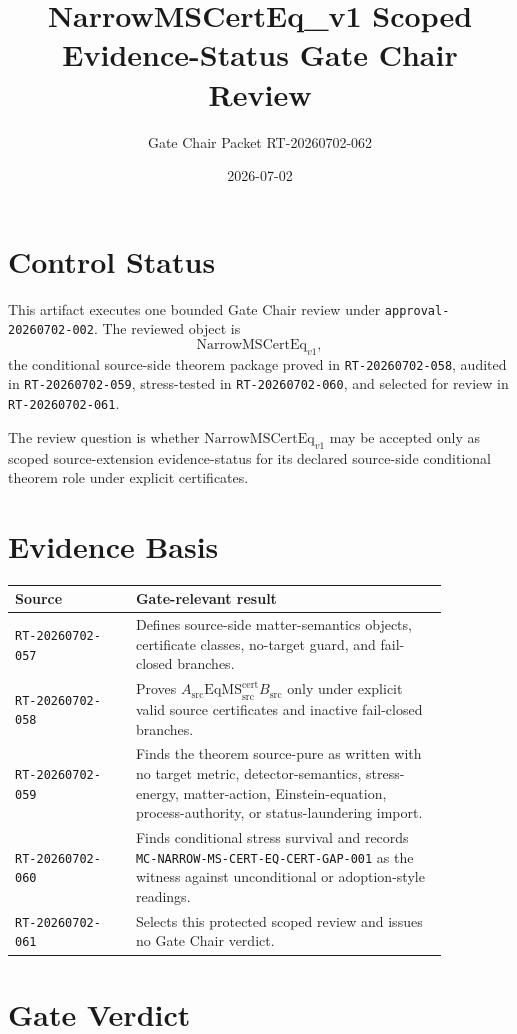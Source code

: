 \documentclass[11pt]{article}
\title{NarrowMSCertEq\_v1 Scoped Evidence-Status Gate Chair Review}
\author{Gate Chair Packet RT-20260702-062}
\date{2026-07-02}
\newcommand{\EqMScert}{\mathrm{EqMS}^{\mathrm{cert}}_{\mathrm{src}}}
\newcommand{\Asrc}{A_{\mathrm{src}}}
\newcommand{\Bsrc}{B_{\mathrm{src}}}
\newcommand{\NarrowMSCertEq}{\mathrm{NarrowMSCertEq}_{v1}}
\begin{document}
\maketitle

\section{Control Status}

This artifact executes one bounded Gate Chair review under
\texttt{approval-20260702-002}. The reviewed object is
\[
  \NarrowMSCertEq,
\]
the conditional source-side theorem package proved in \texttt{RT-20260702-058},
audited in \texttt{RT-20260702-059}, stress-tested in
\texttt{RT-20260702-060}, and selected for review in
\texttt{RT-20260702-061}.

The review question is whether \(\NarrowMSCertEq\) may be accepted only as
scoped source-extension evidence-status for its declared source-side
conditional theorem role under explicit certificates.

\section{Evidence Basis}

\begin{longtable}{p{0.24\linewidth}p{0.62\linewidth}}
\toprule
Source & Gate-relevant result \\
\midrule
\texttt{RT-20260702-057} & Defines source-side matter-semantics objects,
certificate classes, no-target guard, and fail-closed branches. \\
\texttt{RT-20260702-058} & Proves \(\Asrc \EqMScert \Bsrc\) only under
explicit valid source certificates and inactive fail-closed branches. \\
\texttt{RT-20260702-059} & Finds the theorem source-pure as written with no
target metric, detector-semantics, stress-energy, matter-action,
Einstein-equation, process-authority, or status-laundering import. \\
\texttt{RT-20260702-060} & Finds conditional stress survival and records
\texttt{MC-NARROW-MS-CERT-EQ-CERT-GAP-001} as the witness against
unconditional or adoption-style readings. \\
\texttt{RT-20260702-061} & Selects this protected scoped review and issues no
Gate Chair verdict. \\
\bottomrule
\end{longtable}

\section{Gate Verdict}
\end{document}
